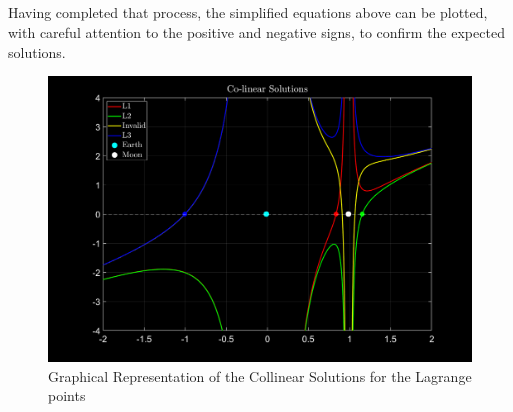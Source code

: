 \begin{center}
    \noindent{} \\ \vspace{5pt}
    \noindent{} \\ \vspace{5pt}
    \noindent{} \\ \vspace{5pt}
    \noindent{} \\ \vspace{5pt}
\end{center}

Having completed that process, the simplified equations above can be plotted, with careful attention to the positive and negative signs, to confirm the expected solutions. 

\begin{figure}[h]
    \centering
    \includegraphics[width=\textwidth]{fig/lagrange123.png}
    \caption{Graphical Representation of the Collinear Solutions for the Lagrange points}
    \label{fig:lagrange_points}
\end{figure}

